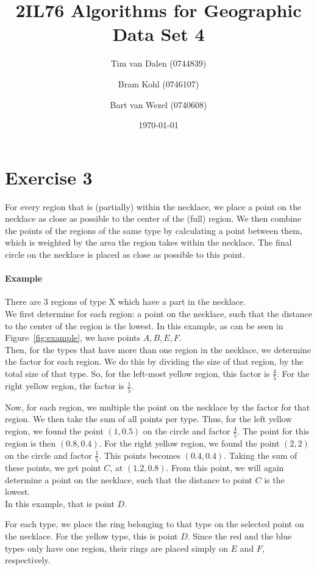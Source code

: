 \documentclass[a4paper,11pt]{article}
\title{
	2IL76 Algorithms for Geographic Data Set 4 \\
}
\author{
	Tim van Dalen (0744839)
	\and
	Bram Kohl (0746107)
	\and
	Bart van Wezel (0740608)
}
\date{\today}
\begin{document}
	\maketitle
	
\section*{Exercise 3}
For every region that is (partially) within the necklace, we place a point on the necklace as close as possible to the center of the (full) region.
We then combine the points of the regions of the same type by calculating a point between them, which is weighted by the area the region takes within the necklace.
The final circle on the necklace is placed as close as possible to this point.

\paragraph{Example} There are 3 regions of type X which have a part in the necklace. \\
We first determine for each region: a point on the necklace, such that the distance to the center of the region is the lowest.
In this example, as can be seen in Figure~\ref{fig:example}, we have points $A,B,E,F$.  \\

Then, for the types that have more than one region in the necklace, we determine the factor for each region.
We do this by dividing the size of that region, by the total size of that type. 
So, for the left-most yellow region, this factor is $\frac{4}{5}$.
For the right yellow region, the factor is $\frac{1}{5}$.

Now, for each region, we multiple the point on the necklace by the factor for that region.
We then take the sum of all points per type.
Thus, for the left yellow region, we found the point $(1,0.5)$ on the circle and factor $\frac{4}{5}$.
The point for this region is then $(0.8,0.4)$.
For the right yellow region, we found the point $(2,2)$ on the circle and factor $\frac{1}{5}$.
This points becomes $(0.4,0.4)$.
Taking the sum of these points, we get point $C$, at $(1.2,0.8)$.
From this point, we will again determine a point on the necklace, such that the distance to point $C$ is the lowest. \\
In this example, that is point $D$.

For each type, we place the ring belonging to that type on the selected point on the necklace.
For the yellow type, this is point $D$.
Since the red and the blue types only have one region, their rings are placed simply on $E$ and $F$, respectively.
\end{document}
